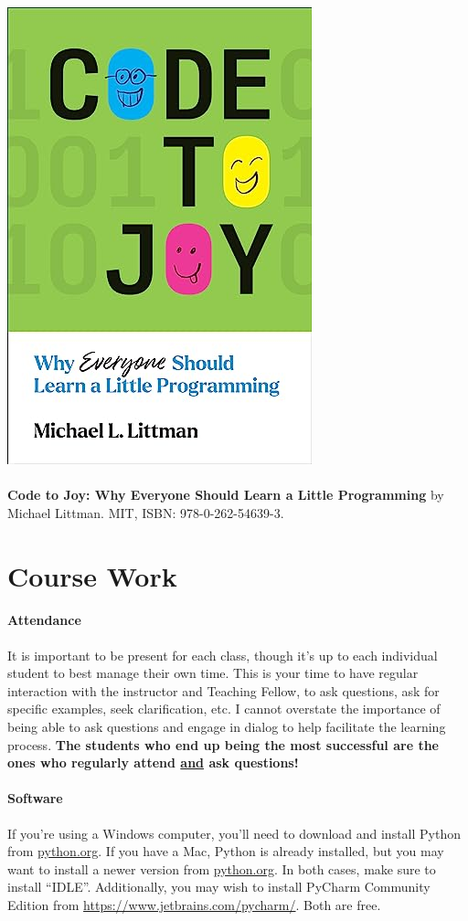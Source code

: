 \documentclass[letter,10pt]{article}
\begin{document}
\includegraphics{Images/CodeToJoy}

\paragraph{}\textbf{Code to Joy: Why Everyone Should Learn a Little Programming} by Michael Littman. MIT, ISBN: 978-0-262-54639-3.

\section*{Course Work}\label{sec:coursework}
\paragraph{Attendance}It is important to be present for each class, though it's up to each individual student to best manage their own time. This is your time to have regular interaction with the instructor and Teaching Fellow, to ask questions, ask for specific examples, seek clarification, etc. I cannot overstate the importance of being able to ask questions and engage in dialog to help facilitate the learning process. \textbf{The students who end up being the most successful are the ones who regularly attend \underline{and} ask questions!}

\paragraph{Software}If you're using a Windows computer, you'll need to download and install Python from \href{https://www.python.org/downloads/windows/}{python.org}. If you have a Mac, Python is already installed, but you may want to install a newer version from \href{https://www.python.org/downloads/macos/}{python.org}. In both cases, make sure to install ``IDLE''. Additionally, you may wish to install PyCharm Community Edition from \url{https://www.jetbrains.com/pycharm/}. Both are free.
\end{document}

